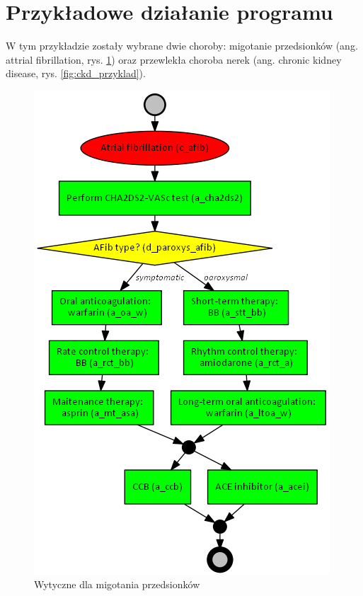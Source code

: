 \section{Przykładowe działanie programu}
W tym przykładzie zostały wybrane dwie choroby: migotanie przedsionków (ang. attrial fibrillation, rys. \ref{fig:afib_przyklad}) oraz przewlekła choroba nerek (ang. chronic kidney disease, rys. \ref{fig:ckd_przyklad}).
\begin{figure}[H]
\centering
\includegraphics[scale=0.5]{img/afib-ver-4_przyklad.png}
\caption{Wytyczne dla migotania przedsionków}
\label{fig:afib_przyklad}
\end{figure}

